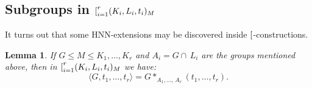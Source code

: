 \documentclass[12pt, a4paper]{amsart}
\newcommand{\1}{\{1\}}
\newcommand{\bigast}{\textrm{\footnotesize\ding{91}}}
\theoremstyle{plain}
\newtheorem{Lemma}[Theorem]{Lemma}
\theoremstyle{definition}
\theoremstyle{remark}
\numberwithin{equation}{section}
\begin{document}
\subsection{Subgroups in $\bigast_{i=1}^{r}(K_i, L_i, t_i)_M$}
\label{SU Subgroups in 
bigast} 
It turns out that some HNN-extensions may be discovered inside $\bigast$-constructions.

\begin{Lemma}
\label{LE intersection in bigger group multi-dimensional}
If $G\le M  \le K_1,\ldots,K_r$ and $A_i  = G \cap \, L_i$ are the groups mentioned above, then in ${\bigast}_{i=1}^{r}(K_i, L_i, t_i)_M$
we have:
$$
\langle G, t_1,\ldots,t_r \rangle= 
G *_{A_1,\ldots,\,A_r } \!(t_1,\ldots,t_r).
$$
\end{Lemma} 
\end{document}

